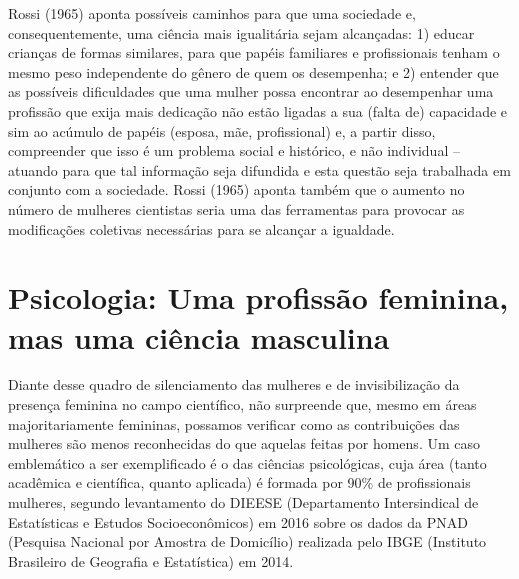 Rossi (1965) aponta possíveis caminhos para que uma sociedade e, consequentemente, uma ciência mais igualitária sejam alcançadas: 1) educar crianças de formas similares, para que papéis familiares e profissionais tenham o mesmo peso independente do gênero de quem os desempenha; e 2) entender que as possíveis dificuldades que uma mulher possa encontrar ao desempenhar uma profissão que exija mais dedicação não estão ligadas a sua (falta de) capacidade e sim ao acúmulo de papéis (esposa, mãe, profissional) e, a partir disso, compreender que isso é um problema social e histórico, e não individual – atuando para que tal informação seja difundida e esta questão seja trabalhada em conjunto com a sociedade. Rossi (1965) aponta também que o aumento no número de mulheres cientistas seria uma das ferramentas para provocar as modificações coletivas necessárias para se alcançar a igualdade.
\vfill
\section*{Psicologia: Uma profissão feminina, mas uma ciência masculina}

Diante desse quadro de silenciamento das mulheres e de invisibilização da presença feminina no campo científico, não surpreende que, mesmo em áreas majoritariamente femininas, possamos verificar como as contribuições das mulheres são menos reconhecidas do que aquelas feitas por homens. Um caso emblemático a ser exemplificado é o das ciências psicológicas, cuja área (tanto acadêmica e científica, quanto aplicada) é formada por 90\% de profissionais mulheres, segundo levantamento do DIEESE (Departamento Intersindical de Estatísticas e Estudos Socioeconômicos) em 2016 sobre os dados da PNAD (Pesquisa Nacional por Amostra de Domicílio) realizada pelo IBGE (Instituto Brasileiro de Geografia e Estatística) em 2014.

